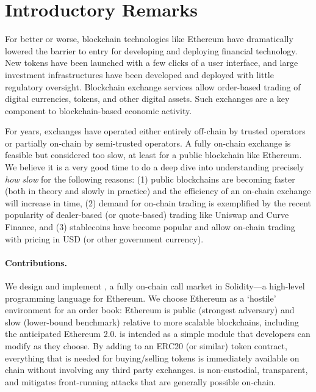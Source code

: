 
\section{Introductory Remarks}

For better or worse, blockchain technologies like Ethereum have dramatically lowered the barrier to entry for developing and deploying financial technology. New tokens have been launched with a few clicks of a user interface, and large investment infrastructures have been developed and deployed with little regulatory oversight. Blockchain exchange services allow order-based trading of digital currencies, tokens, and other digital assets. Such exchanges are a key component to blockchain-based economic activity. 

For years, exchanges have operated either entirely off-chain by trusted operators or partially on-chain by semi-trusted operators. A fully on-chain exchange is feasible but considered too slow, at least for a public blockchain like Ethereum. We believe it is a very good time to do a deep dive into understanding precisely \textit{how slow} for the following reasons: (1) public blockchains are becoming faster (both in theory and slowly in practice) and the efficiency of an on-chain exchange will increase in time, (2) demand for on-chain trading is exemplified by the recent popularity of dealer-based (or quote-based) trading like Uniswap and Curve Finance, and (3) stablecoins have become popular and allow on-chain trading with pricing in USD (or other government currency).

\paragraph{Contributions.} We design and implement \cm, a fully on-chain call market in Solidity---a high-level programming language for Ethereum. We choose Ethereum as a `hostile' environment for an order book: Ethereum is public (strongest adversary) and slow (lower-bound benchmark) relative to more scalable blockchains, including the anticipated Ethereum 2.0. \cm is intended as a simple module that developers can modify as they choose. By adding \cm to an ERC20 (or similar) token contract, everything that is needed for buying/selling tokens is immediately available on chain without involving any third party exchanges. \cm is non-custodial, transparent, and mitigates front-running attacks that are generally possible on-chain.

